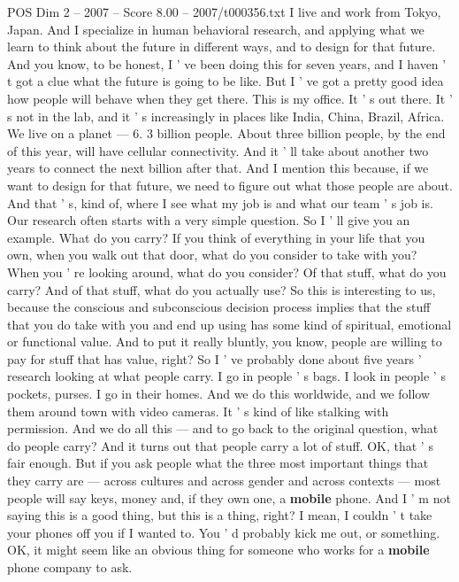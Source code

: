 \begin{textsample}{POS Dim 2 – 2007 – Score 8.00 – 2007/t000356.txt}  \label{ex:f2_pos_090}
I live and work from Tokyo, Japan.
And I specialize in human behavioral research, and applying what we learn to think about the future in different ways, and to design for that future.
And you know, to be honest, I ' ve been doing this for seven years, and I haven ' t got a clue what the future is going to be like.
But I ' ve got a pretty good idea how people will behave when they get there.
This is my office.
It ' s out there.
It ' s not in the lab, and it ' s increasingly in places like India, China, Brazil, Africa.
We live on a planet — 6. 3 billion people.
About three billion people, by the end of this year, will have cellular connectivity.
And it ' ll take about another two years to connect the next billion after that.
And I mention this because, if we want to design for that future, we need to figure out what those people are about.
And that ' s, kind of, where I see what my job is and what our team ' s job is.
Our research often starts with a very simple question.
So I ' ll give you an example.
What do you carry?
If you think of everything in your life that you own, when you walk out that door, what do you consider to take with you?
When you ' re looking around, what do you consider?
Of that stuff, what do you carry?
And of that stuff, what do you actually use?
So this is interesting to us, because the conscious and subconscious decision process implies that the stuff that you do take with you and end up using has some kind of spiritual, emotional or functional value.
And to put it really bluntly, you know, people are willing to pay for stuff that has value, right?
So I ' ve probably done about five years ' research looking at what people carry.
I go in people ' s bags.
I look in people ' s pockets, purses.
I go in their homes.
And we do this worldwide, and we follow them around town with video cameras.
It ' s kind of like stalking with permission.
And we do all this — and to go back to the original question, what do people carry?
And it turns out that people carry a lot of stuff.
OK, that ' s fair enough.
But if you ask people what the three most important things that they carry are — across cultures and across gender and across contexts — most people will say keys, money and, if they own one, a \textbf{mobile} phone.
And I ' m not saying this is a good thing, but this is a thing, right?
I mean, I couldn ' t take your phones off you if I wanted to.
You ' d probably kick me out, or something.
OK, it might seem like an obvious thing for someone who works for a \textbf{mobile} phone company to ask.

\end{textsample}

